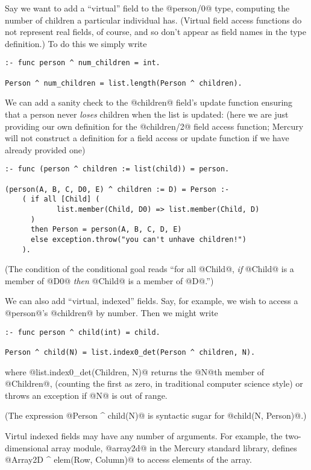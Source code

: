 Say we want to add a ``virtual'' field to the @person/0@ type, computing the
number of children a particular individual has.
(Virtual field access functions do not represent real fields, of course, and
so don't appear as field names in the type definition.)
To do this we simply write
\begin{verbatim}
:- func person ^ num_children = int.

Person ^ num_children = list.length(Person ^ children).
\end{verbatim}

We can add a sanity check to the @children@ field's update function
ensuring that a person never \emph{loses} children when the list is updated:
(here we are just providing our own definition for the @children/2@ field
access function; Mercury will not construct a definition for a field access
or update function if we have already provided one)
\begin{verbatim}
:- func (person ^ children := list(child)) = person.

(person(A, B, C, D0, E) ^ children := D) = Person :-
    ( if all [Child] (
            list.member(Child, D0) => list.member(Child, D)
      ) 
      then Person = person(A, B, C, D, E)
      else exception.throw("you can't unhave children!")
    ).
\end{verbatim}
(The condition of the conditional goal reads ``for all @Child@, \emph{if}
@Child@ is a member of @D0@ \emph{then} @Child@ is a member of @D@.'')

We can also add ``virtual, indexed'' fields.  Say, for example, we wish to
access a @person@'s @children@ by number.  Then we might write
\begin{verbatim}
:- func person ^ child(int) = child.

Person ^ child(N) = list.index0_det(Person ^ children, N).
\end{verbatim}
where @list.index0_det(Children, N)@ returns the @N@th member of @Children@,
(counting the first as zero, in traditional computer science style) or
throws an exception if @N@ is out of range.

(The expression @Person ^ child(N)@ is syntactic sugar for
@child(N, Person)@.)


Virtul indexed fields may have any number of arguments.  For example, the
two-dimensional array module, @array2d@ in the Mercury standard library,
defines @Array2D ^ elem(Row, Column)@ to access elements of the array.

